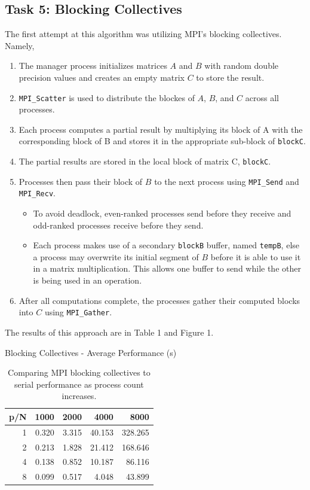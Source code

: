 \documentclass{article}
\begin{document}
\subsection*{Task 5: Blocking Collectives}
The first attempt at this algorithm was utilizing MPI's blocking collectives. Namely, 
\begin{enumerate}
    \item The manager process initializes matrices $A$ and $B$ with random double
    precision values and creates an empty matrix $C$ to store the result.
    \item \texttt{MPI\_Scatter} is used to distribute the blockes of $A$, $B$, and $C$ across all processes.
    \item Each process computes a partial result by multiplying its block of A with the corresponding block of B and stores it in the appropriate sub-block of \texttt{blockC}.
    \item The partial results are stored in the local block of matrix C, \texttt{blockC}.
    \item Processes then pass their block of $B$ to the next process using \texttt{MPI\_Send} and \texttt{MPI\_Recv}.
    \begin{itemize}
        \item To avoid deadlock, even-ranked processes send before they receive and odd-ranked processes receive before they send.
        \item Each process makes use of a secondary \texttt{blockB} buffer, named \texttt{tempB}, else a process may overwrite its initial segment of $B$ before it is able to use it in a matrix multiplication. 
        This allows one buffer to send while the other is being used in an operation.
    \end{itemize}
    \item After all computations complete, the processes gather their computed blocks into $C$ using \texttt{MPI\_Gather}.
\end{enumerate}
The results of this approach are in Table 1 and Figure 1. 
\begin{table}[H]
    \centering
    \caption{Blocking Collectives - Average Performance (s)}
    \fontsize{12}{14}\selectfont
    \begin{tabular}[t]{rrrrr}
    \toprule
    p/N  & 1000 & 2000 & 4000 & 8000\\
    \midrule
    1 & 0.320 & 3.315 & 40.153 & 328.265\\
    2 & 0.213 & 1.828 & 21.412 & 168.646\\
    4 & 0.138 & 0.852 & 10.187 & 86.116\\
    8 & 0.099 & 0.517 & 4.048 & 43.899\\
    \bottomrule
    \end{tabular}
    \caption*{Comparing MPI blocking collectives to serial performance as process count increases.}
\end{table}
\end{document}
